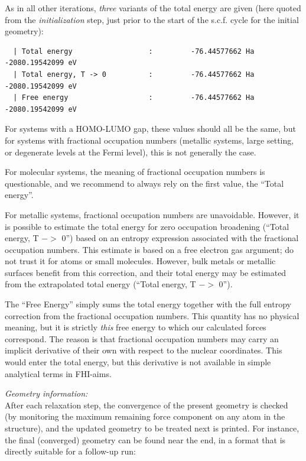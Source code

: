 As in all other iterations, \emph{three} variants of the total energy
are given (here quoted from the \emph{initialization} step, just prior to the
start of the s.c.f. cycle for the initial geometry):
{\small
\begin{verbatim}
  | Total energy                  :         -76.44577662 Ha       -2080.19542099 eV
  | Total energy, T -> 0          :         -76.44577662 Ha       -2080.19542099 eV
  | Free energy                   :         -76.44577662 Ha       -2080.19542099 eV
\end{verbatim}
}
For systems with a HOMO-LUMO gap, these values should all be the same,
but for systems with fractional occupation numbers (metallic systems,
large  setting, or degenerate levels at the
Fermi level), this is not generally the case.

For molecular systems, the meaning of fractional occupation numbers is
questionable, and we recommend to always rely on the first value, the
``Total energy''.

For metallic systems, fractional occupation numbers are
unavoidable. However, it is possible to estimate the total energy for
zero occupation broadening (``Total energy, T $->$ 0'') based on an
entropy expression associated with the fractional occupation
numbers. This estimate is based on a free electron gas argument; do not trust
it for atoms or small molecules. However, bulk metals or metallic
surfaces benefit from this correction, and their total energy may be
estimated from the extrapolated total energy (``Total energy, T $->$
0'').

The ``Free Energy'' simply sums the total energy together
with the full entropy correction from the fractional occupation
numbers. This quantity has no physical meaning, but it is strictly
\emph{this} free energy to which our calculated forces correspond. The
reason is that fractional occupation numbers may carry an implicit
derivative of their own with respect to the nuclear coordinates. This
would enter the total energy, but this derivative is not available in
simple analytical terms in FHI-aims. 

\emph{Geometry information:} \\
After each relaxation step, the convergence of the present geometry is checked
(by monitoring the maximum remaining force component on any atom in the
structure), and the updated geometry to be treated next is printed. For
instance, the final (converged) geometry can be found near the end, in a
format that is directly suitable for a follow-up run:

